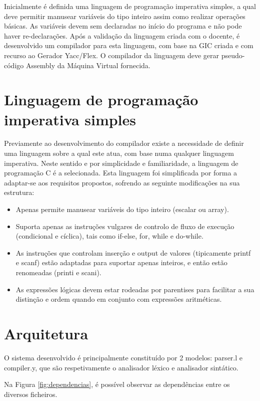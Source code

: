 \documentclass[a4paper,10pt]{report}
\begin{document}
Inicialmente é definida uma linguagem de programação imperativa simples, a qual deve permitir manusear variáveis do tipo inteiro assim como realizar operações básicas. As variáveis devem sem declaradas no início do programa e não pode haver re-declarações. Após a validação da linguagem criada com o docente, é desenvolvido um compilador para esta linguagem, com base na GIC criada e com recurso ao Gerador Yacc/Flex. O compilador da linguagem deve gerar pseudo-código Assembly da Máquina Virtual fornecida.

\section{Linguagem de programação imperativa simples}
    Previamente ao desenvolvimento do compilador existe a necessidade de definir uma linguagem sobre a qual este atua, com base numa qualquer linguagem imperativa. Neste sentido e por simplicidade e familiaridade, a linguagem de programação C é a selecionada. Esta linguagem foi simplificada por forma a adaptar-se aos requisitos propostos, sofrendo as seguinte modificações na sua estrutura:
\begin{itemize}

    \item Apenas permite manusear variáveis do tipo inteiro (escalar ou array).
    \item Suporta apenas as instruções vulgares de controlo de fluxo de execução (condicional e cíclica), tais como if-else, for, while e do-while.
    \item As instruções que controlam inserção e output de valores (tipicamente printf e scanf) estão adaptadas para suportar apenas inteiros, e então estão renomeadas (printi e scani).
    \item As expressões lógicas devem estar rodeadas por parentises para facilitar a sua distinção e ordem quando em conjunto com expressões aritméticas. 
\end{itemize}


\section{Arquitetura}
    O sistema desenvolvido é principalmente constituído por 2 modelos: parser.l e compiler.y, que são respetivamente o analisador léxico e analisador sintático. 

    Na Figura \ref{fig:dependencias}, é possível observar as dependências entre os diversos ficheiros.
\end{document}
